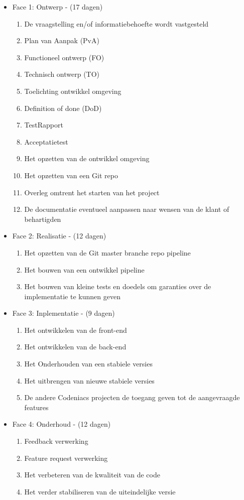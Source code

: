 \documentclass[]{report}
\begin{document}
\begin{itemize}
	\item Face 1: Ontwerp - (17 dagen)
	\begin{enumerate}
		\item De vraagstelling en/of informatiebehoefte wordt vastgesteld
		\item Plan van Aanpak (PvA)
		\item Functioneel ontwerp (FO)
		\item Technisch ontwerp (TO)
		\item Toelichting ontwikkel omgeving
		\item Definition of done (DoD)
		\item TestRapport 
		\item Acceptatietest
		\item Het opzetten van de ontwikkel omgeving
		\item Het opzetten van een Git repo
		\item Overleg omtrent het starten van het project
		\item De documentatie eventueel aanpassen naar wensen van de klant of behartigden
			\newline
	\end{enumerate} 
	
	
	\item Face 2: Realisatie - (12 dagen)
	\begin{enumerate}
		\item Het opzetten van de Git master branche repo pipeline
		\item Het bouwen van een ontwikkel pipeline
		\item Het bouwen van kleine tests en doedels om garanties over de implementatie te kunnen geven
			\newline
	\end{enumerate} 
	
	
	\item Face 3: Inplementatie  - (9 dagen)
	\begin{enumerate}
		\item Het ontwikkelen van de front-end
		\item Het ontwikkelen van de back-end
		\item Het Onderhouden van een stabiele versies
		\item Het uitbrengen van nieuwe stabiele versies
		\item De andere Codeniacs projecten de toegang geven tot de aangevraagde features 
			\newline
	\end{enumerate} 


	\item Face 4: Onderhoud  - (12 dagen)
	\begin{enumerate}
		\item Feedback verwerking
		\item Feature request verwerking
		\item Het verbeteren van de kwaliteit van de code
		\item Het verder stabiliseren van de uiteindelijke versie
	\end{enumerate} 
\end{itemize} 
\end{document}
